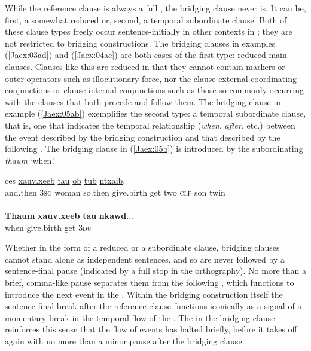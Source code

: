 \documentclass[output=paper]{LSP/langsci}
\begin{document}
While the reference clause is always a full , the bridging clause never is. It can be, first, a somewhat reduced  or, second, a temporal subordinate clause. Both of these clause types freely occur sentence-initially in other contexts in ; they are not restricted to bridging constructions. 
The bridging clauses in examples (\ref{Jaex:03ad}) and (\ref{Jaex:04ac}) are both cases of the first type: reduced main clauses. Clauses like this are reduced in that they cannot contain  markers or outer operators such as illocutionary force, nor the clause-external coordinating conjunctions or clause-internal  conjunctions such as those so commonly occurring with the clauses that both precede and follow them. The bridging clause in example (\ref{Jaex:05ab}) exemplifies the second type: a temporal subordinate clause, that is, one that indicates the temporal relationship (\textit{when}, \textit{after}, etc.) between the event described by the bridging construction and that described by the following . The bridging clause in (\ref{Jaex:05b}) is introduced by the subordinating  \textit{thaum } `when'.
 
\begin{exe}
\ex \label{Jaex:05ab}
\begin{xlist}
\ex \label{Jaex:05a}
\gll ces \underline{} \underline{} \underline{} \underline{xauv.xeeb} \underline{tau} \underline{ob} \underline{} \underline{tub} \underline{ntxaib}.\\
and.then \textsc{3sg} woman so.then give.birth get two \textsc{clf} son twin\\
\glt {}\\
\ex \label{Jaex:05b}
\gll \textbf{Thaum} \textbf{xauv.xeeb} \textbf{tau} \textbf{nkawd}...\\     	      
    when  give.birth get \textsc{3du}\\
\glt {} \citep[][31]{vang90}
\end{xlist}
\end{exe}

Whether in the form of a reduced  or a subordinate clause, bridging clauses cannot stand alone as independent sentences, and so are never followed by a sentence-final pause (indicated by a full stop in the orthography). No more than a brief, comma-like pause separates them from the following , which functions to introduce the next event in the . Within the bridging construction itself the sentence-final break after the reference clause functions iconically as a signal of a momentary break in the temporal flow of the . The  in the bridging clause reinforces this sense that the  flow of events has halted briefly, before it takes off again with no more than a minor pause after the bridging clause.
 
\end{document}

